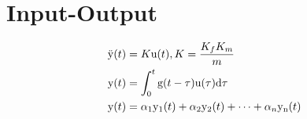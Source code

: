 \section*{Input-Output}

\begin{align*}
    \func{\ddot{y}}[t] &= K \func{u}[t], K = \frac{K_{f}K_{m}}{m} \\
    \func{y}[t] &= \intdef{0}{t}{\func{g}[t-\tau]\func{u}[\tau]}{\tau} \\
    \func{y}[t] &= \alpha_{1}\func{y_{1}}[t]+\alpha_{2}\func{y_{2}}[t]+\cdots+\alpha_{n}\func{y_{n}}[t]
\end{align*}